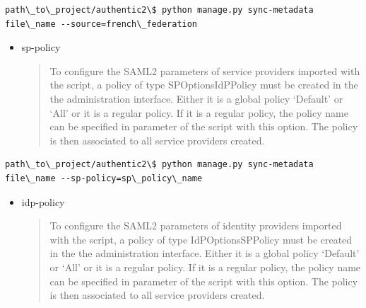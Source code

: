 \documentclass[letterpaper,10pt,english]{sphinxmanual}
\begin{document}
\begin{Verbatim}[commandchars=\\\{\}]
path\_to\_project/authentic2\$ python manage.py sync-metadata file\_name --source=french\_federation
\end{Verbatim}
\begin{itemize}
\item {} 
sp-policy
\begin{quote}

To configure the SAML2 parameters of service providers imported with the
script, a policy of type SPOptionsIdPPolicy must be created in the
the administration interface.
Either it is a global policy `Default' or `All' or it is a regular policy.
If it is a regular policy, the policy name can be specified in parameter
of the script with this option.
The policy is then associated to all service providers created.
\end{quote}

\end{itemize}

\begin{Verbatim}[commandchars=\\\{\}]
path\_to\_project/authentic2\$ python manage.py sync-metadata file\_name --sp-policy=sp\_policy\_name
\end{Verbatim}
\begin{itemize}
\item {} 
idp-policy
\begin{quote}

To configure the SAML2 parameters of identity providers imported with the
script, a policy of type IdPOptionsSPPolicy must be created in the
the administration interface.
Either it is a global policy `Default' or `All' or it is a regular policy.
If it is a regular policy, the policy name can be specified in parameter
of the script with this option.
The policy is then associated to all service providers created.
\end{quote}

\end{itemize}
\end{document}
